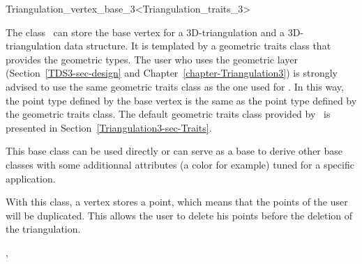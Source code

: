 

\begin{ccRefClass}{Triangulation_vertex_base_3<Triangulation_traits_3>}  %


\ccDefinition

The class \ccRefName\ can store the base vertex for a 3D-triangulation and a 3D-triangulation data structure. It is templated by a
geometric traits class  that provides the geometric
types. The user who uses the geometric layer
(Section~\ref{TDS3-sec-design} and
Chapter~\ref{chapter-Triangulation3}) is strongly advised to use the
same geometric traits class  as the one used for
. In this way, the point type
defined by the base vertex is the same as the point type defined by
the geometric traits class. The default geometric traits class
provided by \cgal\ is presented in
Section~\ref{Triangulation3-sec-Traits}. 

This base class can be used directly or can serve as a base to derive
other base classes with some additionnal attributes (a color for
example) tuned for a specific application.

With this class, a vertex stores a point, which means that the points
of the user will be duplicated. This allows the user to delete his
points before the deletion of the triangulation.


\ccIsModel


\ccSeeAlso

,



\end{ccRefClass}


